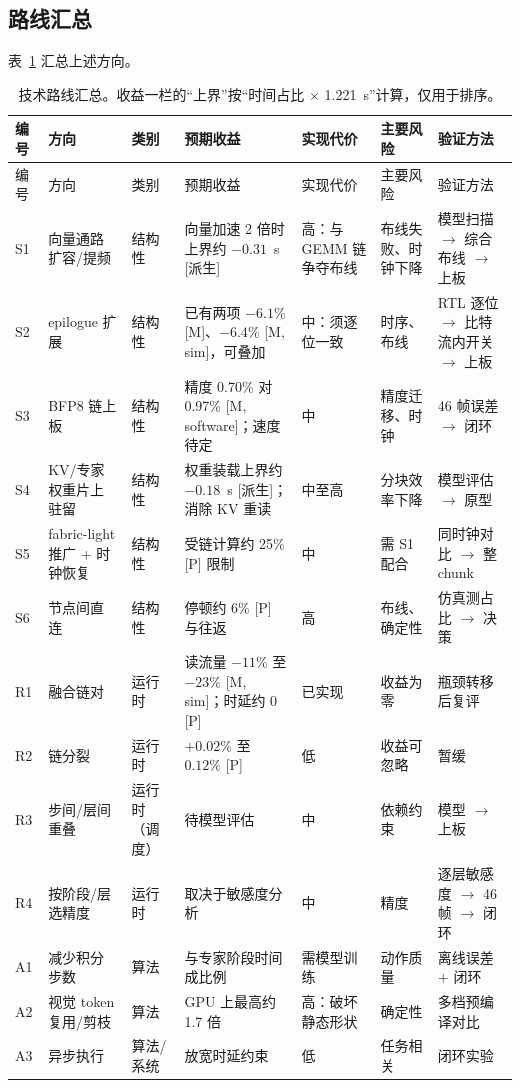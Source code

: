 \documentclass[a4paper,10.5pt]{ctexart}
\newcommand{\tM}{\textsf{[M]}}              %
\newcommand{\tP}{\textsf{[P]}}              %
\newcommand{\tMsim}{\textsf{[M, sim]}}      %
\newcommand{\tMsw}{\textsf{[M, software]}}  %
\newcommand{\tD}{\textsf{[派生]}}           %
\begin{document}
\subsection{路线汇总}

表~\ref{tab:roadmap} 汇总上述方向。

\begin{small}
\begin{longtable}{p{0.7cm} p{2.4cm} p{1.3cm} p{2.9cm} p{1.8cm} p{1.8cm} p{2.2cm}}
\caption{技术路线汇总。收益一栏的“上界”按“时间占比 $\times$ 1.221~s”计算，仅用于排序。}\label{tab:roadmap}\\
\toprule
编号 & 方向 & 类别 & 预期收益 & 实现代价 & 主要风险 & 验证方法 \\
\midrule
\endfirsthead
\toprule
编号 & 方向 & 类别 & 预期收益 & 实现代价 & 主要风险 & 验证方法 \\
\midrule
\endhead
\bottomrule
\endfoot
S1 & 向量通路扩容/提频 & 结构性 & 向量加速 2 倍时上界约 $-0.31$~s \tD & 高：与 GEMM 链争夺布线 & 布线失败、时钟下降 & 模型扫描 $\to$ 综合布线 $\to$ 上板 \\
S2 & epilogue 扩展 & 结构性 & 已有两项 $-6.1\%$ \tM、$-6.4\%$ \tMsim，可叠加 & 中：须逐位一致 & 时序、布线 & RTL 逐位 $\to$ 比特流内开关 $\to$ 上板 \\
S3 & BFP8 链上板 & 结构性 & 精度 0.70\% 对 0.97\% \tMsw；速度待定 & 中 & 精度迁移、时钟 & 46 帧误差 $\to$ 闭环 \\
S4 & KV/专家权重片上驻留 & 结构性 & 权重装载上界约 $-0.18$~s \tD；消除 KV 重读 & 中至高 & 分块效率下降 & 模型评估 $\to$ 原型 \\
S5 & fabric-light 推广 + 时钟恢复 & 结构性 & 受链计算约 25\% \tP{} 限制 & 中 & 需 S1 配合 & 同时钟对比 $\to$ 整 chunk \\
S6 & 节点间直连 & 结构性 & 停顿约 6\% \tP{} 与往返 & 高 & 布线、确定性 & 仿真测占比 $\to$ 决策 \\
R1 & 融合链对 & 运行时 & 读流量 $-11\%$ 至 $-23\%$ \tMsim；时延约 0 \tP & 已实现 & 收益为零 & 瓶颈转移后复评 \\
R2 & 链分裂 & 运行时 & $+0.02\%$ 至 $0.12\%$ \tP & 低 & 收益可忽略 & 暂缓 \\
R3 & 步间/层间重叠 & 运行时（调度） & 待模型评估 & 中 & 依赖约束 & 模型 $\to$ 上板 \\
R4 & 按阶段/层选精度 & 运行时 & 取决于敏感度分析 & 中 & 精度 & 逐层敏感度 $\to$ 46 帧 $\to$ 闭环 \\
A1 & 减少积分步数 & 算法 & 与专家阶段时间成比例 & 需模型训练 & 动作质量 & 离线误差 + 闭环 \\
A2 & 视觉 token 复用/剪枝 & 算法 & GPU 上最高约 1.7 倍~\cite{vlacache} & 高：破坏静态形状 & 确定性 & 多档预编译对比 \\
A3 & 异步执行 & 算法/系统 & 放宽时延约束~\cite{rtc} & 低 & 任务相关 & 闭环实验 \\
\end{longtable}
\end{small}
\end{document}
